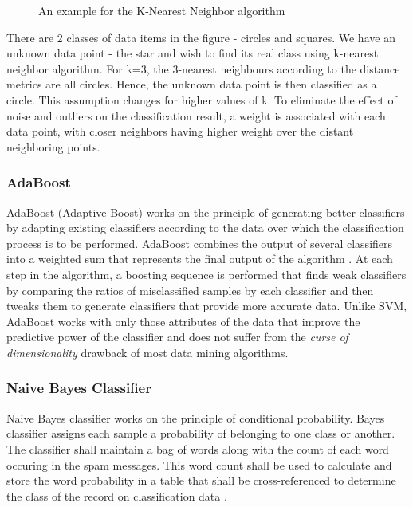 \documentclass[9pt,twocolumn,twoside]{../../styles/osajnl}
\begin{document}
\begin{figure}[htbp]
\centering
{}
\caption{An example for the K-Nearest Neighbor algorithm \cite{www-knn-introduction}}
\label{fig: An example for the K-Nearest Neighbor algorithm}
\end{figure}

\noindent
There are 2 classes of data items in the figure - circles and
squares. We have an unknown data point - the star and wish to find its
real class using k-nearest neighbor algorithm. For k=3, the 3-nearest
neighbours according to the distance metrics are all circles. Hence,
the unknown data point is then classified as a circle. This assumption
changes for higher values of k. To eliminate the effect of noise and
outliers on the classification result, a weight is associated with
each data point, with closer neighbors having higher weight over the
distant neighboring points.

\subsubsection{AdaBoost}

AdaBoost (Adaptive Boost) works on the principle of generating better
classifiers by adapting existing classifiers according to the data
over which the classification process is to be performed. AdaBoost
combines the output of several classifiers into a weighted sum that
represents the final output of the algorithm
\cite{www-adaboost-wiki}. At each step in the algorithm, a boosting
sequence is performed that finds weak classifiers by comparing the
ratios of misclassified samples by each classifier and then tweaks
them to generate classifiers that provide more accurate data. Unlike
SVM, AdaBoost works with only those attributes of the data that
improve the predictive power of the classifier and does not suffer
from the \emph{curse of dimensionality}
\cite{www-curseofdimensionality-wiki} drawback of most data mining
algorithms.

\subsubsection{Naive Bayes Classifier}

Naive Bayes classifier works on the principle of conditional
probability. Bayes classifier assigns each sample a probability of
belonging to one class or another. The classifier shall maintain a bag
of words along with the count of each word occuring in the spam
messages. This word count shall be used to calculate and store the
word probability in a table that shall be cross-referenced to
determine the class of the record on classification data
\cite{paper-classification-of-email}.
\end{document}
